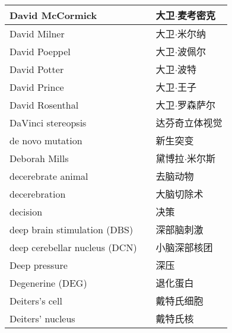 \begin{longtable}{lll}
	\midrule
	David McCormick     &&  大卫$\cdot$麦考密克  \\
	
	\midrule
	David Milner     &&  大卫$\cdot$米尔纳  \\
	
	\midrule
	David Poeppel     &&  大卫$\cdot$波佩尔  \\
	
	\midrule
	David Potter     &&  大卫$\cdot$波特  \\
	
	\midrule
	David Prince     &&  大卫$\cdot$王子  \\
	
	\midrule
	David Rosenthal     &&  大卫$\cdot$罗森萨尔  \\
	
	\midrule
	DaVinci stereopsis     &&  达芬奇立体视觉  \\
	
	\midrule
	de novo mutation     &&  新生突变  \\
	
	\midrule
	Deborah Mills     &&  黛博拉$\cdot$米尔斯  \\
	
	\midrule
	decerebrate animal     &&  去脑动物  \\
	
	\midrule
	decerebration     &&  大脑切除术  \\
	
	\midrule
	decision     &&  决策  \\
	
	\midrule
	deep brain stimulation (DBS)     &&  深部脑刺激  \\
	
	\midrule
	deep cerebellar nucleus (DCN)  &&  小脑深部核团  \\
	
	\midrule
	Deep pressure   &&  深压  \\
	
	\midrule
	Degenerine (DEG)  &&  退化蛋白  \\
	
	\midrule
	Deiters's cell   &&  戴特氏细胞  \\
	
	\midrule
	Deiters' nucleus   &&  戴特氏核  \\
	

\end{longtable}
